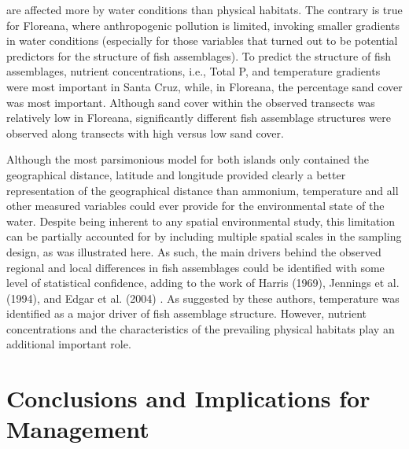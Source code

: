 \documentclass[jmse,article,accept,moreauthors,pdftex]{Definitions/mdpi}
\begin{document}
\begin{paracol}{2}
 are affected more by water conditions than physical habitats. The contrary is true for Floreana, where anthropogenic pollution is limited, invoking smaller gradients in water conditions (especially for those variables that turned out to be potential predictors for the structure of fish assemblages). To predict the structure of fish assemblages, nutrient concentrations, i.e., Total P, and temperature gradients were most important in Santa Cruz, while, in Floreana, the percentage sand cover was most important. Although sand cover within the observed transects was relatively low in Floreana, significantly different fish assemblage structures were observed along transects with high versus low sand cover.

Although the most parsimonious model for both islands only contained the geographical distance, latitude and longitude provided clearly a better representation of the geographical distance than ammonium, temperature and all other measured variables could ever provide for the environmental state of the water. Despite being inherent to any spatial environmental study, this limitation can be partially accounted for by including multiple spatial scales in the sampling design, as was illustrated here. As such, the main drivers behind the observed regional and local differences in fish assemblages could be identified with some level of statistical confidence, adding to the work of Harris (1969), Jennings et al. (1994), and Edgar et al. (2004) \citep{Harris1969BreedingIslands,Jennings1994TheArchipelago,Edgar2004}. As suggested by these authors, temperature was identified as a major driver of fish assemblage structure. However, nutrient concentrations and the characteristics of the prevailing physical habitats play an additional important role. 



%
\section{Conclusions and Implications for Management}


\end{paracol}
\end{document}
